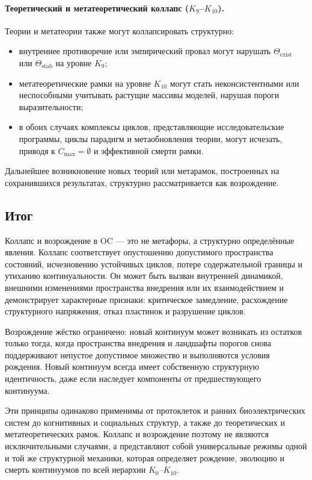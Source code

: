 \paragraph{Теоретический и метатеоретический коллапс
(\texorpdfstring{\(K_9\)}{K_9}–\(K_{10}\)).}
Теории и метатеории также могут коллапсировать структурно:
\begin{itemize}
  \item внутреннее противоречие или эмпирический провал могут нарушать
        \(\Theta_{\mathrm{exist}}\) или \(\Theta_{\mathrm{stab}}\) на
        уровне \(K_9\);
  \item метатеоретические рамки на уровне \(K_{10}\) могут стать
        неконсистентными или неспособными учитывать растущие массивы моделей,
        нарушая пороги выразительности;
  \item в обоих случаях комплексы циклов, представляющие исследовательские
        программы, циклы парадигм и метаобновления теории, могут исчезать,
        приводя к \(C_{\max}=\emptyset\) и эффективной смерти рамки.
\end{itemize}
Дальнейшее возникновение новых теорий или метарамок, построенных на
сохранившихся результатах, структурно рассматривается как возрождение.

\subsection{Итог}

Коллапс и возрождение в OC — это не метафоры, а структурно определённые
явления. Коллапс соответствует опустошению допустимого пространства
состояний, исчезновению устойчивых циклов, потере содержательной границы и
утиханию континуальности. Он может быть вызван внутренней динамикой, внешними
изменениями пространства внедрения или их взаимодействием и демонстрирует
характерные признаки: критическое замедление, расхождение структурного
напряжения, отказ пластинок и разрушение циклов.

Возрождение жёстко ограничено: новый континуум может возникать из остатков
только тогда, когда пространства внедрения и ландшафты порогов снова поддерживают
непустое допустимое множество и выполняются условия рождения. Новый континуум
всегда имеет собственную структурную идентичность, даже если наследует
компоненты от предшествующего континуума.

Эти принципы одинаково применимы от протоклеток и ранних биоэлектрических
систем до когнитивных и социальных структур, а также до теоретических и
метатеоретических рамок. Коллапс и возрождение поэтому не являются
исключительными случаями, а представляют собой универсальные режимы одной и той
же структурной механики, которая определяет рождение, эволюцию и смерть
континуумов по всей иерархии \(K_0\)–\(K_{10}\).
